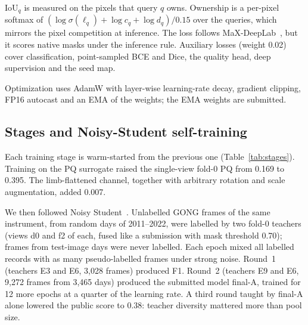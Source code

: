 \documentclass[sigconf]{acmart}
\begin{document}
$\mathrm{IoU}_q$ is measured on the pixels that query $q$ owns. Ownership is a per-pixel softmax of $(\log\sigma(\ell_q)+\log c_q+\log d_q)/0.15$ over the queries, which mirrors the pixel competition at inference. The loss follows MaX-DeepLab~\cite{wang2021maxdeeplab}, but it scores native masks under the inference rule. Auxiliary losses (weight 0.02) cover classification, point-sampled BCE and Dice, the quality head, deep supervision and the seed map.

Optimization uses AdamW with layer-wise learning-rate decay, gradient clipping, FP16 autocast and an EMA of the weights; the EMA weights are submitted.

\subsection{Stages and Noisy-Student self-training}\label{sec:selftraining}
Each training stage is warm-started from the previous one (Table~\ref{tab:stages}). Training on the PQ surrogate raised the single-view fold-0 PQ from 0.169 to 0.395. The limb-flattened channel, together with arbitrary rotation and scale augmentation, added 0.007.

We then followed Noisy Student~\cite{xie2020noisystudent}. Unlabelled GONG frames of the same instrument, from random days of 2011--2022, were labelled by two fold-0 teachers (views d0 and f2 of each, fused like a submission with mask threshold 0.70); frames from test-image days were never labelled. Each epoch mixed all labelled records with as many pseudo-labelled frames under strong noise. Round~1 (teachers E3 and E6, 3,028 frames) produced F1. Round~2 (teachers E9 and E6, 9,272 frames from 3,465 days) produced the submitted model final-A, trained for 12 more epochs at a quarter of the learning rate. A third round taught by final-A alone lowered the public score to 0.38: teacher diversity mattered more than pool size.
\end{document}
